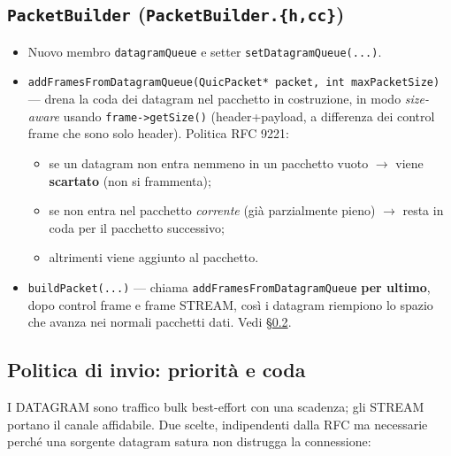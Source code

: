 \documentclass[11pt,a4paper]{article}
\newcommand{\code}[1]{\texttt{#1}}
\begin{document}
\subsection{\code{PacketBuilder} (\code{PacketBuilder.\{h,cc\}})}
\begin{itemize}[nosep,leftmargin=1.4em]
  \item Nuovo membro \code{datagramQueue} e setter \code{setDatagramQueue(...)}.
  \item \code{addFramesFromDatagramQueue(QuicPacket* packet, int maxPacketSize)} --- drena la coda dei
    datagram nel pacchetto in costruzione, in modo \emph{size-aware} usando \code{frame->getSize()}
    (header+payload, a differenza dei control frame che sono solo header). Politica RFC 9221:
    \begin{itemize}[nosep]
      \item se un datagram non entra nemmeno in un pacchetto vuoto $\to$ viene \textbf{scartato}
        (non si frammenta);
      \item se non entra nel pacchetto \emph{corrente} (gi\`a parzialmente pieno) $\to$ resta in coda per il
        pacchetto successivo;
      \item altrimenti viene aggiunto al pacchetto.
    \end{itemize}
  \item \code{buildPacket(...)} --- chiama \code{addFramesFromDatagramQueue} \textbf{per ultimo}, dopo
    control frame e frame STREAM, cos\`i i datagram riempiono lo spazio che avanza nei normali
    pacchetti dati. Vedi \S\ref{sec:queuepolicy}.
\end{itemize}

\subsection{Politica di invio: priorit\`a e coda}
\label{sec:queuepolicy}

I DATAGRAM sono traffico bulk best-effort con una scadenza; gli STREAM portano il canale
affidabile. Due scelte, indipendenti dalla RFC ma necessarie perch\'e una sorgente datagram satura
non distrugga la connessione:
\end{document}
